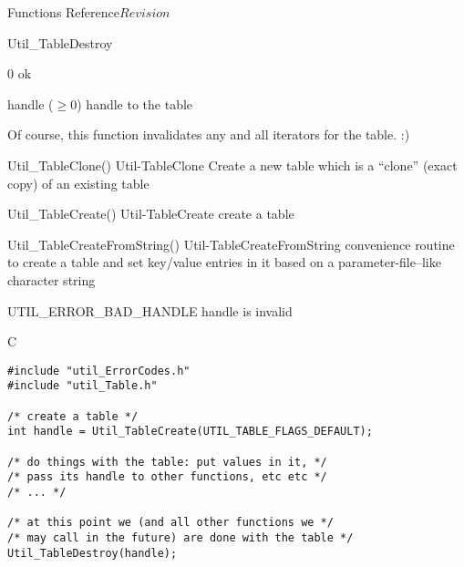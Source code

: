 \begin{cactuspart}{ Functions Reference}{}{$Revision$}
\begin{FunctionDescription}{Util\_TableDestroy}
\begin{ResultSection}
\begin{Result}{\rm 0}
ok
\end{Result}
\end{ResultSection}

\begin{ParameterSection}
\begin{Parameter}{handle ($\ge 0$)}
handle to the table
\end{Parameter}
\end{ParameterSection}

\begin{Discussion}
Of course, this function invalidates any and all iterators for the table. :)
\end{Discussion}

\begin{SeeAlsoSection}
\begin{SeeAlso2} {Util\_TableClone()} {Util-TableClone}
Create a new table which is a ``clone'' (exact copy) of an existing
table
\end{SeeAlso2}
\begin{SeeAlso2} {Util\_TableCreate()} {Util-TableCreate}
create a table
\end{SeeAlso2}
\begin{SeeAlso2} {Util\_TableCreateFromString()} {Util-TableCreateFromString}
convenience routine to create a table and set key/value entries
in it based on a parameter-file--like character string
\end{SeeAlso2}
\end{SeeAlsoSection}

\begin{ErrorSection}
\begin{Error}{UTIL\_ERROR\_BAD\_HANDLE}
handle is invalid
\end{Error}
\end{ErrorSection}

\begin{ExampleSection}
\begin{Example}{C}
\begin{verbatim}
#include "util_ErrorCodes.h"
#include "util_Table.h"

/* create a table */
int handle = Util_TableCreate(UTIL_TABLE_FLAGS_DEFAULT);

/* do things with the table: put values in it, */
/* pass its handle to other functions, etc etc */
/* ... */

/* at this point we (and all other functions we */
/* may call in the future) are done with the table */
Util_TableDestroy(handle);
\end{verbatim}
\end{Example}
\end{ExampleSection}
\end{FunctionDescription}


\end{cactuspart}
